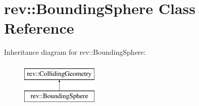\hypertarget{classrev_1_1_bounding_sphere}{}\section{rev\+::Bounding\+Sphere Class Reference}
\label{classrev_1_1_bounding_sphere}
Inheritance diagram for rev\+::Bounding\+Sphere\+:\begin{figure}[H]
\begin{center}
\leavevmode
\includegraphics[height=2.000000cm]{classrev_1_1_bounding_sphere}
\end{center}
\end{figure}
